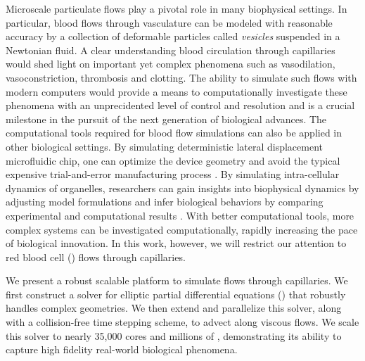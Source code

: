 
Microscale particulate flows play a pivotal role in many biophysical settings.
In particular, blood flows through vasculature can be modeled with reasonable accuracy by a collection of deformable particles called \textit{vesicles} suspended in a Newtonian fluid.
A clear understanding blood circulation through capillaries would shed light on important yet complex phenomena such as vasodilation, vasoconstriction, thrombosis and clotting.
The ability to simulate such flows with modern computers would provide a means to computationally investigate these phenomena with an unprecidented level of control and resolution and is a crucial milestone in the pursuit of the next generation of biological advances.
The computational tools required for blood flow simulations can also be applied in other biological settings.
By simulating deterministic lateral displacement microfluidic chip, one can optimize the device geometry and avoid the typical expensive trial-and-error manufacturing process \cite{kabacaouglu2019sorting}.
By simulating intra-cellular dynamics of organelles, researchers can gain insights into biophysical dynamics by adjusting model formulations and infer biological behaviors by comparing experimental and computational results \cite{nazockdast2017cytoplasmic}. 
With better computational tools, more complex systems can be investigated computationally, rapidly increasing the pace of biological innovation.
In this work, however, we will restrict our attention to red blood cell (\rbc) flows through capillaries.

We present a robust scalable platform to simulate \rbc flows through capillaries. 
We first construct a solver for elliptic partial differential equations (\pdes) that robustly handles complex geometries.
We then extend and parallelize this solver, along with a collision-free time stepping scheme, to advect \rbcs along viscous flows.
We scale this solver to nearly 35,000 cores and millions of \rbcs, demonstrating its ability to capture high fidelity real-world biological phenomena.

